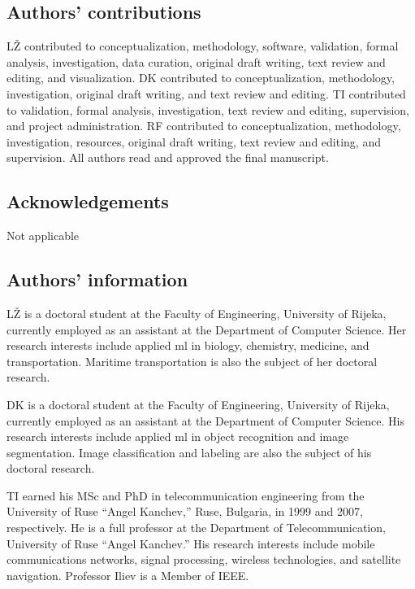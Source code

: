 \let\LaTeXcline\cline\documentclass[sn-mathphys-num]{sn-jnl}\let\cline\LaTeXcline
\begin{document}
\subsection{Authors' contributions}

L\v{Z} contributed to conceptualization, methodology, software, validation, formal analysis, investigation, data curation, original draft writing, text review and editing, and visualization. DK contributed to conceptualization, methodology, investigation, original draft writing, and text review and editing. TI contributed to validation, formal analysis, investigation, text review and editing, supervision, and project administration. RF contributed to conceptualization, methodology, investigation, resources, original draft writing, text review and editing, and supervision. All authors read and approved the final manuscript.

\subsection{Acknowledgements}

Not applicable

\subsection{Authors' information}

L\v{Z} is a doctoral student at the Faculty of Engineering, University of Rijeka, currently employed as an assistant at the Department of Computer Science. Her research interests include applied \acrlong{ml} in biology, chemistry, medicine, and transportation. Maritime transportation is also the subject of her doctoral research.

DK is a doctoral student at the Faculty of Engineering, University of Rijeka, currently employed as an assistant at the Department of Computer Science. His research interests include applied \acrlong{ml} in object recognition and image segmentation. Image classification and labeling are also the subject of his doctoral research.

TI earned his MSc and PhD in telecommunication engineering from the University of Ruse “Angel Kanchev,” Ruse, Bulgaria, in 1999 and 2007, respectively. He is a full professor at the Department of Telecommunication, University of Ruse “Angel Kanchev.” His research interests include mobile communications networks, signal processing, wireless technologies, and satellite navigation. Professor Iliev is a Member of IEEE.
\end{document}
